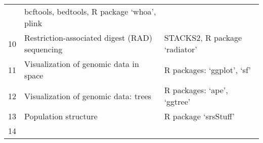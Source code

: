 \documentclass[]{book}
\begin{document}
\begin{longtable}[]{@{}lll@{}}
\begin{minipage}[t]{0.46\columnwidth}
\end{minipage} & \begin{minipage}[t]{0.33\columnwidth}\raggedright
bcftools, bedtools, R package `whoa', plink\strut
\end{minipage}\tabularnewline
\begin{minipage}[t]{0.13\columnwidth}\raggedright
10\strut
\end{minipage} & \begin{minipage}[t]{0.46\columnwidth}\raggedright
Restriction-associated digest (RAD) sequencing\strut
\end{minipage} & \begin{minipage}[t]{0.33\columnwidth}\raggedright
STACKS2, R package `radiator'\strut
\end{minipage}\tabularnewline
\begin{minipage}[t]{0.13\columnwidth}\raggedright
11\strut
\end{minipage} & \begin{minipage}[t]{0.46\columnwidth}\raggedright
Visualization of genomic data in space\strut
\end{minipage} & \begin{minipage}[t]{0.33\columnwidth}\raggedright
R packages: `ggplot', `sf'\strut
\end{minipage}\tabularnewline
\begin{minipage}[t]{0.13\columnwidth}\raggedright
12\strut
\end{minipage} & \begin{minipage}[t]{0.46\columnwidth}\raggedright
Visualization of genomic data: trees\strut
\end{minipage} & \begin{minipage}[t]{0.33\columnwidth}\raggedright
R packages: `ape', `ggtree'\strut
\end{minipage}\tabularnewline
\begin{minipage}[t]{0.13\columnwidth}\raggedright
13\strut
\end{minipage} & \begin{minipage}[t]{0.46\columnwidth}\raggedright
Population structure\strut
\end{minipage} & \begin{minipage}[t]{0.33\columnwidth}\raggedright
R package `srsStuff'\strut
\end{minipage}\tabularnewline
\begin{minipage}[t]{0.13\columnwidth}\raggedright
14\strut
\end{minipage} & \begin{minipage}[t]{0.46\columnwidth}\raggedright

\end{minipage}
\end{longtable}
\end{document}
